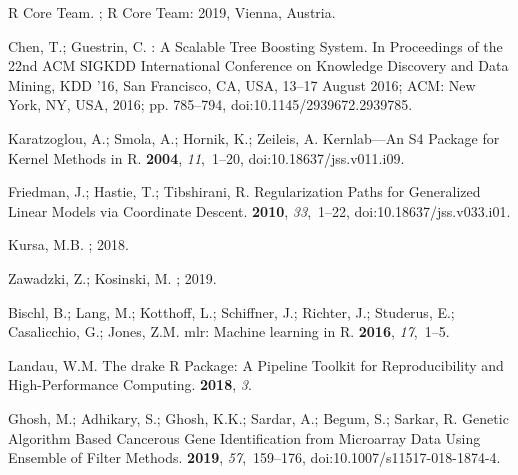 \documentclass[remotesensing,article,accept,moreauthors,pdftex]{Definitions/mdpi}
\begin{document}
\begin{thebibliography}{999}
{R Core Team}.
;  R Core Team: 2019, Vienna, Austria.

Chen, T.; Guestrin, C.
: A {{Scalable Tree Boosting System}}.
\newblock  In Proceedings of the {{22nd ACM SIGKDD International Conference}} on
  {{Knowledge Discovery}} and {{Data Mining}}, {{KDD}} '16, San Francisco, CA, USA, 13--17 August 2016; {ACM}: {New York, NY, USA},
  2016; pp. 785--794, doi:10.1145/2939672.2939785.

Karatzoglou, A.; Smola, A.; Hornik, K.; Zeileis, A.
\newblock Kernlab---{{An S4 Package}} for {{Kernel Methods}} in {{R}}.
 {\bf 2004}, {\em 11},~1--20, doi:10.18637/jss.v011.i09.

Friedman, J.; Hastie, T.; Tibshirani, R.
\newblock Regularization Paths for Generalized Linear Models via Coordinate
  Descent.
 {\bf 2010}, {\em 33},~1--22, doi:10.18637/jss.v033.i01.

Kursa, M.B.
;  2018.

Zawadzki, Z.; Kosinski, M.
;  2019.

Bischl, B.; Lang, M.; Kotthoff, L.; Schiffner, J.; Richter, J.; Studerus, E.;
  Casalicchio, G.; Jones, Z.M.
\newblock mlr: Machine learning in {R}.
 {\bf 2016}, {\em
  17},~1--5.

Landau, W.M.
\newblock The {drake} {{R}} Package: A Pipeline Toolkit for Reproducibility and
  High-Performance Computing.
 {\bf 2018}, {\em 3}.

Ghosh, M.; Adhikary, S.; Ghosh, K.K.; Sardar, A.; Begum, S.; Sarkar, R.
\newblock Genetic Algorithm Based Cancerous Gene Identification from Microarray
  Data Using Ensemble of Filter Methods.
 {\bf 2019}, {\em
  57},~159--176, doi:10.1007/s11517-018-1874-4.


\end{thebibliography}
\end{document}
